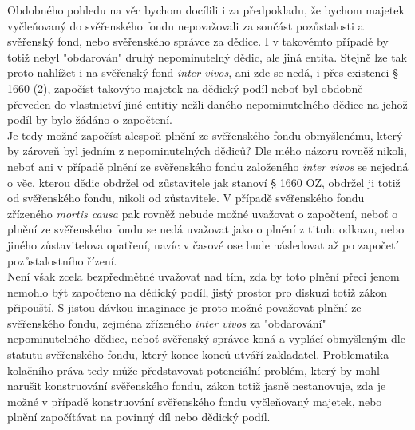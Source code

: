 \documentclass{article}
\begin{document}
Obdobného pohledu na věc bychom docílili i za předpokladu, že bychom majetek vyčleňovaný do svěřenského fondu nepovažovali za součást pozůstalosti a svěřenský fond, nebo svěřenského správce za dědice. I v takovémto případě by totiž nebyl "obdarován" druhý nepominutelný dědic, ale jiná entita. Stejně lze tak proto nahlížet i na svěřenský fond \textit{inter vivos}, ani zde se nedá, i přes existenci § 1660 (2), započíst takovýto majetek na dědický podíl neboť byl obdobně převeden do vlastnictví jiné entitiy nežli daného nepominutelného dědice na jehož podíl by bylo žádáno o započtení.\\

Je tedy možné započíst alespoň plnění ze svěřenského fondu obmyšlenému, který by zároveň byl jedním z nepominutelných dědiců? Dle mého názoru rovněž nikoli, neboť ani v případě plnění ze svěřenského fondu založeného \textit{inter vivos} se nejedná o věc, kterou dědic obdržel od zůstavitele jak stanoví § 1660 OZ, obdržel ji totiž od svěřenského fondu, nikoli od zůstavitele. V případě svěřenského fondu zřízeného \textit{mortis causa} pak rovněž nebude možné uvažovat o započtení, neboť o plnění ze svěřenského fondu se nedá uvažovat jako o plnění z titulu odkazu, nebo jiného zůstavitelova opatření, navíc v časové ose bude následovat až po započetí pozůstalostního řízení.\\

Není však zcela bezpředmětné uvažovat nad tím, zda by toto plnění přeci jenom nemohlo být započteno na dědický podíl, jistý prostor pro diskuzi totiž zákon připouští. S jistou dávkou imaginace je proto možné považovat plnění ze svěřenského fondu, zejména zřízeného \textit{inter vivos} za "obdarování" nepominutelného dědice, neboť svěřenský správce koná a vyplácí obmyšleným dle statutu svěřenského fondu, který konec konců utváří zakladatel. Problematika kolačního práva tedy může představovat potenciální problém, který by mohl narušit konstruování svěřenského fondu, zákon totiž jasně nestanovuje, zda je možné v případě konstruování svěřenského fondu vyčleňovaný majetek, nebo plnění započítávat na povinný díl nebo dědický podíl.

\end{document}
